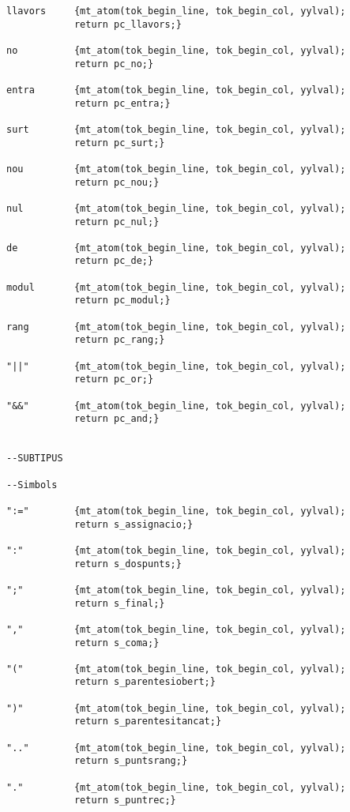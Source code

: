 \documentclass[10pt]{report}
\begin{document}
\begin{lstlisting}
llavors     {mt_atom(tok_begin_line, tok_begin_col, yylval); 
            return pc_llavors;}

no          {mt_atom(tok_begin_line, tok_begin_col, yylval); 
            return pc_no;}

entra       {mt_atom(tok_begin_line, tok_begin_col, yylval); 
            return pc_entra;}

surt        {mt_atom(tok_begin_line, tok_begin_col, yylval); 
            return pc_surt;}

nou         {mt_atom(tok_begin_line, tok_begin_col, yylval); 
            return pc_nou;}

nul         {mt_atom(tok_begin_line, tok_begin_col, yylval); 
            return pc_nul;}

de          {mt_atom(tok_begin_line, tok_begin_col, yylval); 
            return pc_de;}

modul       {mt_atom(tok_begin_line, tok_begin_col, yylval); 
            return pc_modul;}

rang        {mt_atom(tok_begin_line, tok_begin_col, yylval); 
            return pc_rang;}

"||"        {mt_atom(tok_begin_line, tok_begin_col, yylval); 
            return pc_or;}

"&&"        {mt_atom(tok_begin_line, tok_begin_col, yylval); 
            return pc_and;}


--SUBTIPUS

--Simbols 

":="        {mt_atom(tok_begin_line, tok_begin_col, yylval); 
            return s_assignacio;}

":"         {mt_atom(tok_begin_line, tok_begin_col, yylval); 
            return s_dospunts;}

";"         {mt_atom(tok_begin_line, tok_begin_col, yylval); 
            return s_final;}

","         {mt_atom(tok_begin_line, tok_begin_col, yylval); 
            return s_coma;}

"("         {mt_atom(tok_begin_line, tok_begin_col, yylval);
            return s_parentesiobert;}

")"         {mt_atom(tok_begin_line, tok_begin_col, yylval);
            return s_parentesitancat;}

".."        {mt_atom(tok_begin_line, tok_begin_col, yylval); 
            return s_puntsrang;}
            
"."         {mt_atom(tok_begin_line, tok_begin_col, yylval); 
            return s_puntrec;}



\end{lstlisting}
\end{document}
